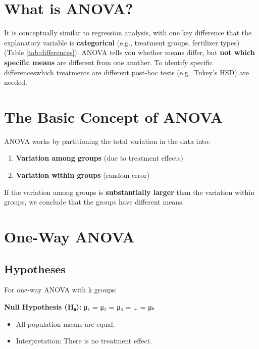 \documentclass[
]{book}
\providecommand{\tightlist}{%
  \setlength{\itemsep}{0pt}\setlength{\parskip}{0pt}}
\begin{document}
\section{What is ANOVA?}\label{what-is-anova}

It is conceptually similar to regression analysis, with one key difference that the explanatory variable is \textbf{categorical} (e.g., treatment groups, fertilizer types) (Table \ref{tab:differences}). ANOVA tells you whether means differ, but \textbf{not which specific means} are different from one another. To identify specific differenceswhich treatments are different post-hoc tests (e.g.~Tukey's HSD) are needed.

\section{The Basic Concept of ANOVA}\label{the-basic-concept-of-anova}

ANOVA works by partitioning the total variation in the data into:

\begin{enumerate}
\def\labelenumi{\arabic{enumi}.}
\tightlist
\item
  \textbf{Variation among groups} (due to treatment effects)
\item
  \textbf{Variation within groups} (random error)
\end{enumerate}

If the variation among groups is \textbf{substantially larger} than the variation within groups, we conclude that the groups have different means.

\section{One-Way ANOVA}\label{one-way-anova}

\subsection{Hypotheses}\label{hypotheses}

For one-way ANOVA with k groups:

\textbf{Null Hypothesis (H₀):} μ₁ = μ₂ = μ₃ = \ldots{} = μₖ

\begin{itemize}
\tightlist
\item
  All population means are equal.
\item
  Interpretation: There is no treatment effect.
\end{itemize}
\end{document}
